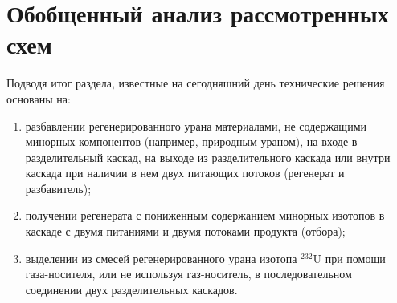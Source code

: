 \section{Обобщенный анализ рассмотренных схем}

Подводя итог раздела, известные на сегодняшний день технические решения основаны на:
\begin{enumerate}
  \item разбавлении регенерированного урана материалами, не содержащими минорных компонентов (например, природным ураном), на входе в разделительный каскад, на выходе из разделительного каскада или внутри каскада при наличии в нем двух питающих потоков (регенерат и разбавитель);
  \item получении регенерата с пониженным содержанием минорных изотопов в каскаде с двумя питаниями и двумя потоками продукта (отбора);
  \item выделении из смесей регенерированного урана изотопа $^{232}$U при помощи газа-носителя, или не используя газ-носитель, в последовательном соединении двух разделительных каскадов.
\end{enumerate}



